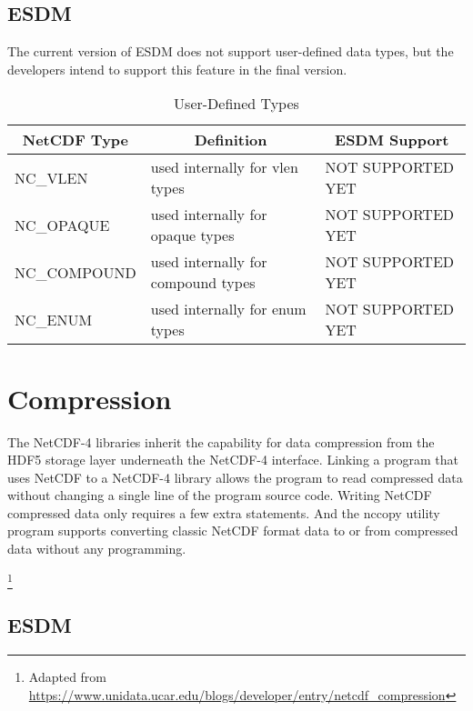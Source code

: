 \subsection{ESDM}

The current version of ESDM does not support user-defined data types, but the developers intend to support this feature in the final version.

\begin{table}[H]
\centering
\begin{tabular}{|l|m{6cm}|l|}
\hline
\multicolumn{1}{|c|}{NetCDF Type} & \multicolumn{1}{c|}{Definition} & \multicolumn{1}{c|}{ESDM Support} \\ \hline \hline
\scriptsize{NC\_VLEN} & used internally for vlen types &      \scriptsize{NOT SUPPORTED YET}       \\ \hline
\scriptsize{NC\_OPAQUE} & used internally for opaque types &     \scriptsize{NOT SUPPORTED YET}        \\ \hline
\scriptsize{NC\_COMPOUND} & used internally for compound types &    \scriptsize{NOT SUPPORTED YET}         \\ \hline
\scriptsize{NC\_ENUM} & used internally for enum types &       \scriptsize{NOT SUPPORTED YET}      \\ \hline \hline
\end{tabular}
\caption{\label{ud-datatypes} User-Defined Types}
\end{table}

\section{Compression}

{\itshape

The NetCDF-4 libraries inherit the capability for data compression from the HDF5 storage layer underneath the NetCDF-4 interface.
Linking a program that uses NetCDF to a NetCDF-4 library allows the program to read compressed data without changing a single line of the program source code.
Writing NetCDF compressed data only requires a few extra statements.
And the nccopy utility program supports converting classic NetCDF format data to or from compressed data without any programming.
}\footnote{Adapted from \url{https://www.unidata.ucar.edu/blogs/developer/entry/netcdf_compression}}

\subsection{ESDM}

